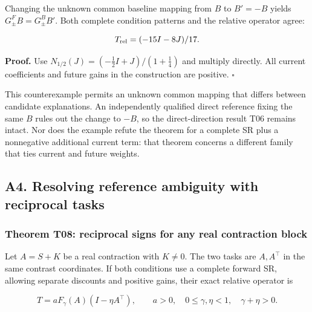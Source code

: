 \documentclass[11pt,a4paper]{article}
\begin{document}
\par
\noindent\begin{minipage}{\linewidth}

Changing the unknown common baseline mapping from \(B\) to \(B'=-B\)
yields \(G^F_\pm B=G^B_\pm B'\). Both complete condition patterns and
the relative operator agree:

\[
T_{\rm rel}=(-15I-8J)/17.
\]

\end{minipage}\par

\textbf{Proof.} Use \(N_{1/2}(J)=(-\tfrac12 I+J)/(1+\tfrac14)\) and
multiply directly. All current coefficients and future gains in the
construction are positive. \(\square\)

This counterexample permits an unknown common mapping that differs
between candidate explanations. An independently qualified direct
reference fixing the same \(B\) rules out the change to \(-B\), so the
direct-direction result T06 remains intact. Nor does the example refute
the theorem for a complete SR plus a nonnegative additional current
term: that theorem concerns a different family that ties current and
future weights.

\subsection{A4. Resolving reference ambiguity with reciprocal
tasks}\label{a4.-resolving-reference-ambiguity-with-reciprocal-tasks}

\subsubsection{Theorem T08: reciprocal signs for any real contraction
block}\label{theorem-t08-reciprocal-signs-for-any-real-contraction-block}

\par
\noindent\begin{minipage}{\linewidth}

Let \(A=S+K\) be a real contraction with \(K\ne0\). The two tasks are
\(A,A^\top\) in the same contrast coordinates. If both conditions use a
complete forward SR, allowing separate discounts and positive gains,
their exact relative operator is

\[
T=aF_\gamma(A)(I-\eta A^\top),
\qquad a>0,\quad0\le\gamma,\eta<1,\quad\gamma+\eta>0.
\]

\end{minipage}\par
\end{document}
